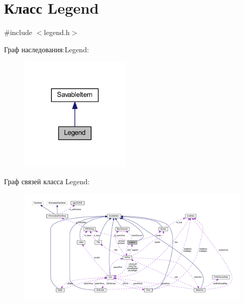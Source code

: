 \hypertarget{class_legend}{\section{Класс Legend}
\label{class_legend}
}


{\ttfamily \#include $<$legend.\-h$>$}



Граф наследования\-:Legend\-:
\nopagebreak
\begin{figure}[H]
\begin{center}
\leavevmode
\includegraphics[width=149pt]{class_legend__inherit__graph}
\end{center}
\end{figure}


Граф связей класса Legend\-:
\nopagebreak
\begin{figure}[H]
\begin{center}
\leavevmode
\includegraphics[width=350pt]{class_legend__coll__graph}
\end{center}
\end{figure}
